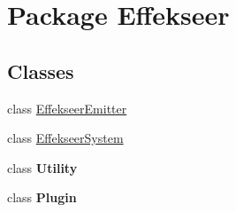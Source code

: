 \hypertarget{namespace_effekseer}{\section{Package Effekseer}
\label{namespace_effekseer}
}
\subsection*{Classes}
\begin{DoxyCompactItemize}
\item 
class \hyperlink{class_effekseer_1_1_effekseer_emitter}{Effekseer\-Emitter}
\item 
class \hyperlink{class_effekseer_1_1_effekseer_system}{Effekseer\-System}
\item 
class {\bfseries Utility}
\item 
class {\bfseries Plugin}
\end{DoxyCompactItemize}
